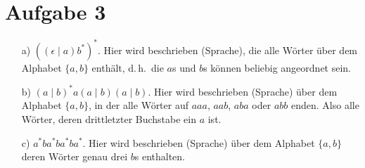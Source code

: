 \documentclass[11pt,a4paper,ngerman]{article}
\renewcommand\dh{d.\,h.\ }
\begin{document}
\section*{Aufgabe 3}
\begin{itemize}
	\item[a)] $\left((\epsilon\mid a)b^*\right)^*$. Hier wird beschrieben (Sprache), die alle Wörter über dem Alphabet $\{a,b\}$ enthält, \dh die $a$s und $b$s können beliebig angeordnet sein.
	\item[b)] $(a\mid b)^* a(a\mid b)(a\mid b)$.  Hier wird beschrieben (Sprache) über dem Alphabet $\{a,b\}$, in der alle Wörter auf $aaa$, $aab$, $aba$ oder $abb$ enden. Also alle Wörter, deren drittletzter Buchstabe ein $a$ ist.
	\item[c)] $a^* ba^* ba^* ba^*$. Hier wird beschrieben (Sprache) über dem Alphabet $\{a,b\}$ deren Wörter genau drei $b$s enthalten.
\end{itemize}
\end{document}
